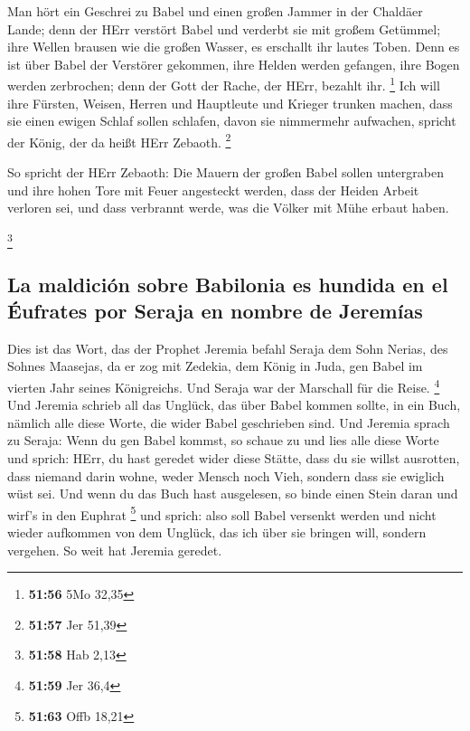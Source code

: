  Man hört ein Geschrei zu Babel und einen großen Jammer
in der Chaldäer Lande;  denn der HErr verstört Babel und
verderbt sie mit großem Getümmel; ihre Wellen brausen wie die großen
Wasser, es erschallt ihr lautes Toben.  Denn es ist über
Babel der Verstörer gekommen, ihre Helden werden gefangen, ihre Bogen
werden zerbrochen; denn der Gott der Rache, der HErr, bezahlt ihr.
\footnote{\textbf{51:56} 5Mo 32,35}  Ich will ihre
Fürsten, Weisen, Herren und Hauptleute und Krieger trunken machen, dass
sie einen ewigen Schlaf sollen schlafen, davon sie nimmermehr aufwachen,
spricht der König, der da heißt HErr Zebaoth. \footnote{\textbf{51:57}
  Jer 51,39}

 So spricht der HErr Zebaoth: Die Mauern der großen Babel
sollen untergraben und ihre hohen Tore mit Feuer angesteckt werden, dass
der Heiden Arbeit verloren sei, und dass verbrannt werde, was die Völker
mit Mühe erbaut haben.

\footnote{\textbf{51:58} Hab 2,13}

\hypertarget{la-maldiciuxf3n-sobre-babilonia-es-hundida-en-el-uxe9ufrates-por-seraja-en-nombre-de-jeremuxedas}{%
\subsection{La maldición sobre Babilonia es hundida en el Éufrates por
Seraja en nombre de
Jeremías}\label{la-maldiciuxf3n-sobre-babilonia-es-hundida-en-el-uxe9ufrates-por-seraja-en-nombre-de-jeremuxedas}}

 Dies ist das Wort, das der Prophet Jeremia befahl Seraja
dem Sohn Nerias, des Sohnes Maasejas, da er zog mit Zedekia, dem König
in Juda, gen Babel im vierten Jahr seines Königreichs. Und Seraja war
der Marschall für die Reise. \footnote{\textbf{51:59} Jer 36,4}
 Und Jeremia schrieb all das Unglück, das über Babel
kommen sollte, in ein Buch, nämlich alle diese Worte, die wider Babel
geschrieben sind.  Und Jeremia sprach zu Seraja: Wenn du
gen Babel kommst, so schaue zu und lies alle diese Worte 
und sprich: HErr, du hast geredet wider diese Stätte, dass du sie willst
ausrotten, dass niemand darin wohne, weder Mensch noch Vieh, sondern
dass sie ewiglich wüst sei.  Und wenn du das Buch hast
ausgelesen, so binde einen Stein daran und wirf's in den Euphrat
\footnote{\textbf{51:63} Offb 18,21}  und sprich: also
soll Babel versenkt werden und nicht wieder aufkommen von dem Unglück,
das ich über sie bringen will, sondern vergehen. So weit hat Jeremia
geredet.

